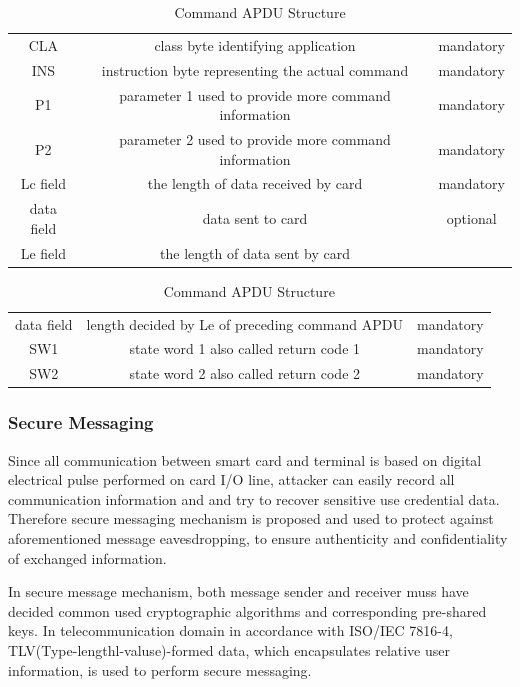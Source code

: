\documentclass[]{llncs}
\begin{document}
\begin{table}[!htbp]
\caption{Command APDU Structure}
\centering
\begin{tabular}{ c c c}
\hline\hline
 CLA &class byte identifying application  & mandatory \\[0.5ex]
 INS &instruction byte representing the actual command  & mandatory \\
 P1 &parameter 1 used to provide more command information & mandatory \\
 P2 &parameter 2 used to provide more command information& mandatory \\
 Lc field &the length of data received by card & mandatory \\
 data field &data sent to card& optional \\
Le field &the length of data sent by card \\
\hline
\end{tabular}
\label{table:capdu}
\end{table}

\begin{table}[ht]
\caption{Command APDU Structure}
\centering
\begin{tabular}{ c c c}
\hline\hline
 data field & length decided by Le of preceding command  APDU  & mandatory \\[0.5ex]
 SW1 &state word 1 also called return code 1  & mandatory \\
 SW2 &state word 2 also called return code 2& mandatory \\
\hline
\end{tabular}
\label{table:rapdu}
\end{table}
\subsubsection{Secure Messaging}
Since all communication between smart card and terminal is based on digital electrical pulse performed on card I/O line, attacker can easily record all communication information and and try to recover sensitive use credential data. Therefore secure messaging mechanism is proposed and used to protect against aforementioned message eavesdropping, to ensure authenticity and confidentiality of exchanged information.

In secure message mechanism, both message sender and receiver muss have decided common used cryptographic algorithms and corresponding pre-shared keys. In telecommunication domain in accordance with ISO/IEC 7816-4\cite{handbuch}, TLV(Type-lengthl-valuse)-formed data, which encapsulates relative user information, is used to perform secure messaging.
\end{document}
